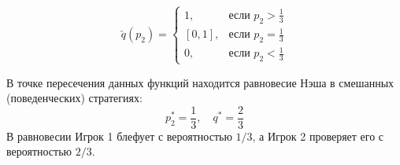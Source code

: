 \begin{equation}
    \check{q}(p_2) = 
    \begin{cases} 
    1, & \text{если } p_2 > \frac{1}{3} \\ 
    [0, 1], & \text{если } p_2 = \frac{1}{3} \\ 
    0, & \text{если } p_2 < \frac{1}{3} 
    \end{cases}
\end{equation}

В точке пересечения данных функций находится равновесие Нэша в смешанных (поведенческих) стратегиях:
\begin{equation}
    p_2^* = \frac{1}{3}, \quad q^* = \frac{2}{3}
\end{equation}
В равновесии Игрок 1 блефует с вероятностью $1/3$, а Игрок 2 проверяет его с вероятностью $2/3$.
